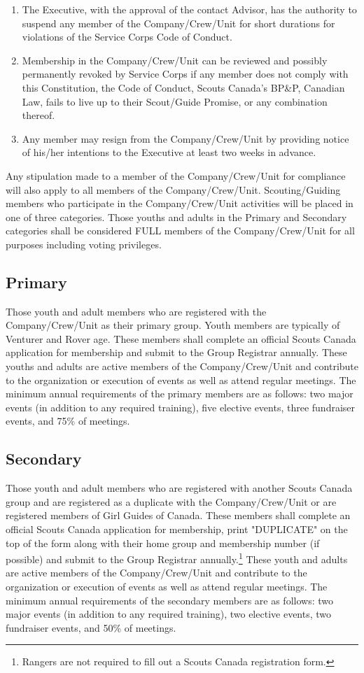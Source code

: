 \documentclass{Service_Corps_Document}
\begin{document}
\begin{enumerate}
        \item The Executive, with the approval of the contact Advisor, has the authority to suspend any member of the Company/Crew/Unit for short durations for violations of the Service Corps Code of Conduct.
        \item Membership in the Company/Crew/Unit can be reviewed and possibly permanently revoked by Service Corps if any member does not comply with this Constitution, the Code of Conduct, Scouts Canada's BP\&P, Canadian Law, fails to live up to their Scout/Guide Promise, or any combination thereof.
        \item Any member may resign from the Company/Crew/Unit by providing notice of his/her intentions to the Executive at least two weeks in advance.
    \end{enumerate}
    Any stipulation made to a member of the Company/Crew/Unit for compliance will also apply to all members of the Company/Crew/Unit.
    Scouting/Guiding members who participate in the Company/Crew/Unit activities will be placed in one of three categories.
    Those youths and adults in the Primary and Secondary categories shall be considered FULL members of the Company/Crew/Unit for all purposes including voting privileges.

    \subsection{Primary}\label{subsec:primary}
    Those youth and adult members who are registered with the Company/Crew/Unit as their primary group.
    Youth members are typically of Venturer and Rover age.
    These members shall complete an official Scouts Canada application for membership and submit to the Group Registrar annually.
    These youths and adults are active members of the Company/Crew/Unit and contribute to the organization or execution of events as well as attend regular meetings.
    The minimum annual requirements of the primary members are as follows: two major events (in addition to any required training), five elective events, three fundraiser events, and 75\% of meetings.

    \subsection{Secondary}\label{subsec:secondary}
    Those youth and adult members who are registered with another Scouts Canada group and are registered as a duplicate with the Company/Crew/Unit or are registered members of Girl Guides of Canada.
    These members shall complete an official Scouts Canada application for membership, print "DUPLICATE" on the top of the form along with their home group and membership number (if possible) and submit to the Group Registrar annually.\footnote{Rangers are not required to fill out a Scouts Canada registration form.} These youth and adults are active members of the Company/Crew/Unit and contribute to the organization or execution of events as well as attend regular meetings.
    The minimum annual requirements of the secondary members are as follows: two major events (in addition to any required training), two elective events, two fundraiser events, and 50\% of meetings.
\end{document}
